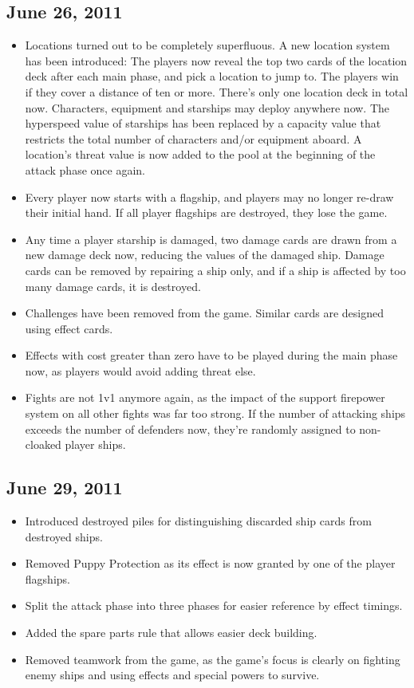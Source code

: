 \documentclass[11pt, a4paper]{article}
\begin{document}
\subsection{June 26, 2011}

\begin{itemize}
 \item Locations turned out to be completely superfluous. A new location system
has been introduced: The players now reveal the top two cards of the location
deck after each main phase, and pick a location to jump to. The players win
if they cover a distance of ten or more. There's only one location deck in
total now. Characters, equipment and starships may deploy anywhere now. The
hyperspeed value of starships has been replaced by a capacity value that
restricts the total number of characters and/or equipment aboard. A location's
threat value is now added to the pool at the beginning of the attack phase
once again.
 \item Every player now starts with a flagship, and players may no longer
re-draw their initial hand. If all player flagships are destroyed, they lose
the game.
 \item Any time a player starship is damaged, two damage cards are drawn from
a new damage deck now, reducing the values of the damaged ship. Damage cards
can be removed by repairing a ship only, and if a ship is affected by too many
damage cards, it is destroyed.
 \item Challenges have been removed from the game. Similar cards are designed
using effect cards.
 \item Effects with cost greater than zero have to be played during the main
phase now, as players would avoid adding threat else.
 \item Fights are not 1v1 anymore again, as the impact of the support firepower
system on all other fights was far too strong. If the number of attacking
ships exceeds the number of defenders now, they're randomly assigned to
non-cloaked player ships.
\end{itemize}

\subsection{June 29, 2011}

\begin{itemize}
 \item Introduced destroyed piles for distinguishing discarded ship
cards from destroyed ships.
 \item Removed Puppy Protection as its effect is now granted by one of the
player flagships.
 \item Split the attack phase into three phases for easier reference by effect
timings.
 \item Added the spare parts rule that allows easier deck building.
 \item Removed teamwork from the game, as the game's focus is clearly on
fighting enemy ships and using effects and special powers to survive.
\end{itemize}
\end{document}
